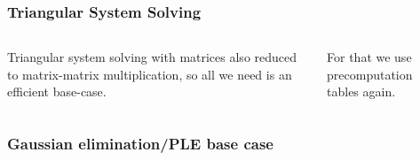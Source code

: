 \documentclass[11pt]{beamer}
\begin{document}
\begin{frame}[fragile]
\frametitle{Triangular System Solving}

\begin{columns}


Triangular system solving with matrices also reduced to matrix-matrix multiplication, so all we need is an efficient base-case. 

\vspace{1em}

For that we use precomputation tables again.


\begin{algorithm}[H]
\label{alg:travolta_trsm_upper_left}
\end{algorithm}
 
\end{columns}

\end{frame}


\begin{frame}
\frametitle{Gaussian elimination/PLE base case}

\begin{algorithm}[H]
\end{algorithm}
\end{frame}
\end{document}
